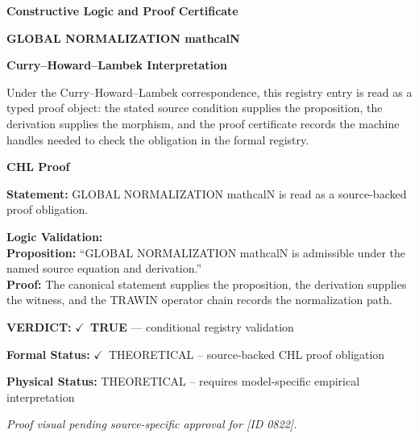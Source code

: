 \clearpage
\begingroup\tzpsupportsetup
\noindent\textbf{\fontsize{10.8pt}{12.8pt}\selectfont [ID 0822] Constructive Logic and Proof Certificate}\par
\noindent\textbf{\fontsize{10pt}{12pt}\selectfont GLOBAL NORMALIZATION mathcalN}\par
\vspace{0.45em}
\begingroup
\footnotesize
\setlength{\parskip}{0.22em}
\setlength{\parindent}{0pt}
\noindent\textbf{Curry--Howard--Lambek Interpretation}\par
Under the Curry--Howard--Lambek correspondence, this registry entry is read as a typed proof
object: the stated source condition supplies the proposition, the derivation supplies the
morphism, and the proof certificate records the machine handles needed to check the obligation
in the formal registry.

\vspace{0.45em}
\noindent\textbf{CHL Proof}\par
\textbf{Statement:} GLOBAL NORMALIZATION mathcalN is read as a source-backed proof obligation.

\textbf{Logic Validation:}\\
\textbf{Proposition:} ``GLOBAL NORMALIZATION mathcalN is admissible under the named source equation and derivation.''\\
\textbf{Proof:} The canonical statement supplies the proposition, the derivation supplies the witness, and the TRAWIN operator chain records the normalization path.

\textbf{VERDICT:} \ensuremath{\checkmark}\ \textbf{TRUE} --- conditional registry validation

\textbf{Formal Status:} \ensuremath{\checkmark}\ THEORETICAL -- source-backed CHL proof obligation

\textbf{Physical Status:} THEORETICAL -- requires model-specific empirical interpretation
\par\vspace{0.45em}
\par
\vfill
\begingroup\footnotesize\itshape
Proof visual pending source-specific approval for [ID 0822].
\par\endgroup
\vfill
\endgroup
\endgroup
